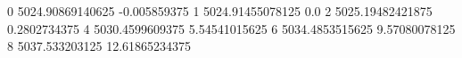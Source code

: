 0 5024.90869140625 -0.005859375
1 5024.91455078125 0.0
2 5025.19482421875 0.2802734375
4 5030.4599609375 5.54541015625
6 5034.4853515625 9.57080078125
8 5037.533203125 12.61865234375
